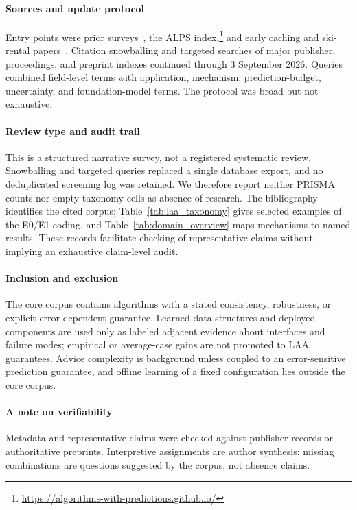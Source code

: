 \documentclass[acmsmall,screen,nonacm]{acmart}
\theoremstyle{acmdefinition}%
\begin{document}
\paragraph{Sources and update protocol} Entry points were prior surveys~\cite{mitzenmacher2021algorithms,mitzenmacher2022survey,boyar2017advice}, the ALPS index,\footnote{\url{https://algorithms-with-predictions.github.io/}} and early caching and ski-rental papers~\cite{lykouris2018competitive,purohit2018improving}. Citation snowballing and targeted searches of major publisher, proceedings, and preprint indexes continued through 3 September 2026. Queries combined field-level terms with application, mechanism, prediction-budget, uncertainty, and foundation-model terms. The protocol was broad but not exhaustive.

\paragraph{Review type and audit trail} This is a structured narrative survey, not a registered systematic review. Snowballing and targeted queries replaced a single database export, and no deduplicated screening log was retained. We therefore report neither PRISMA counts nor empty taxonomy cells as absence of research. The bibliography identifies the cited corpus; Table~\ref{tab:laa_taxonomy} gives selected examples of the E0/E1 coding, and Table~\ref{tab:domain_overview} maps mechanisms to named results. These records facilitate checking of representative claims without implying an exhaustive claim-level audit.

\paragraph{Inclusion and exclusion} The core corpus contains algorithms with a stated consistency, robustness, or explicit error-dependent guarantee. Learned data structures and deployed components are used only as labeled adjacent evidence about interfaces and failure modes; empirical or average-case gains are not promoted to LAA guarantees. Advice complexity is background unless coupled to an error-sensitive prediction guarantee, and offline learning of a fixed configuration lies outside the core corpus.

\paragraph{A note on verifiability} Metadata and representative claims were checked against publisher records or authoritative preprints. Interpretive assignments are author synthesis; missing combinations are questions suggested by the corpus, not absence claims.
\end{document}
